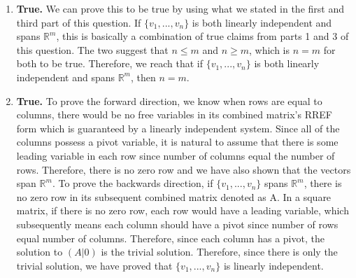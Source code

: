 \documentclass{article}
\begin{document}
\begin{enumerate}
\begin{enumerate}
\item \textbf{True.} We can prove this to be true by using what we stated in the first and third part of this question. If $\{v_1,...,v_n\}$ is both linearly independent and spans $\mathbb{R}^m$, this is basically a combination of true claims from parts 1 and 3 of this question. The two suggest that $n \leq m$ and $n \geq m$, which is $n = m$ for both to be true. Therefore, we reach that if $\{v_1,...,v_n\}$ is both linearly independent and spans $\mathbb{R}^m$, then $n = m$.

\item \textbf{True.} To prove the forward direction, we know when rows are equal to columns, there would be no free variables in its combined matrix's RREF form which is guaranteed by a linearly independent system. Since all of the columns possess a pivot variable, it is natural to assume that there is some leading variable in each row since number of columns equal the number of rows. Therefore, there is no zero row and we have also shown that the vectors span $\mathbb{R}^m$. To prove the backwards direction, if $\{v_1,...,v_n\}$ spans $\mathbb{R}^m$, there is no zero row in its subsequent combined matrix denoted as A. In a square matrix, if there is no zero row, each row would have a leading variable, which subsequently means each column should have a pivot since number of rows equal number of columns. Therefore, since each column has a pivot, the solution to $(A|0)$ is the trivial solution. Therefore, since there is only the trivial solution, we have proved that $\{v_1,...,v_n\}$ is linearly independent.

\end{enumerate}

\end{enumerate}
\end{document}

